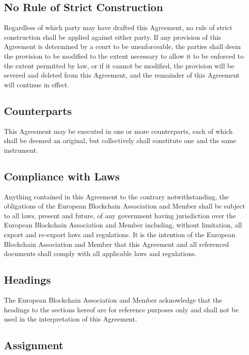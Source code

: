 \documentclass{article}
\begin{document}
\subsection{No Rule of Strict Construction}

Regardless of which party may have drafted this Agreement, no rule of strict construction shall be applied against either party. 
If any provision of this Agreement is determined by a court to be unenforceable, the parties shall deem the provision to be modified to the extent necessary to allow it to be enforced to the extent permitted by law, or if it cannot be modified, the provision will be severed and deleted from this Agreement, and the remainder of this Agreement will continue in effect.

\subsection{Counterparts}

This Agreement may be executed in one or more counterparts, each of which shall be deemed an original, but collectively shall constitute one and the same instrument.

\subsection{Compliance with Laws}

Anything contained in this Agreement to the contrary notwithstanding, the obligations of the European Blockchain Association and Member shall be subject to all laws, present and future, of any government having jurisdiction over the European Blockchain Association and Member including, without limitation, all export and re-export laws and regulations. 
It is the intention of the European Blockchain Association and Member that this Agreement and all referenced documents shall comply with all applicable laws and regulations.

\subsection{Headings}

The European Blockchain Association and Member acknowledge that the headings to the sections hereof are for reference purposes only and shall not be used in the interpretation of this Agreement.

\subsection{Assignment}
\end{document}

